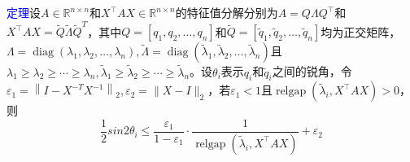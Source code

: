 \documentclass[12pt,a4paper]{article}
\begin{document}
\textcolor{blue}{定理}\quad 设$A \in \mathbb{R}^{n \times n}$和$X^{\top} A X \in \mathbb{R}^{n \times n}$的特征值分解分别为$A=Q \Lambda Q^{\top}$和$X^{\top} A X=\tilde{Q} \tilde{\Lambda} \tilde{Q}^T$，其中$Q=\left[q_{1}, q_{2}, \ldots, q_{n}\right]$和$\tilde{Q}=\left[\tilde{q}_{1}, \tilde{q}_{2}, \ldots, \tilde{q}_{n}\right]$均为正交矩阵，$\Lambda=\operatorname{diag}\left(\lambda_{1}, \lambda_{2}, \ldots, \lambda_{n}\right), \tilde{\Lambda}=\operatorname{diag}\left(\tilde{\lambda}_{1}, \tilde{\lambda}_{2}, \ldots, \tilde{\lambda}_{n}\right)$且$\lambda_{1} \geq \lambda_{2} \geq \cdots \geq \lambda_{n}, \tilde{\lambda}_{1} \geq \tilde{\lambda}_{2} \geq \cdots \geq \tilde{\lambda}_{n}$。设$\theta_{i}$表示$q_i$和$\tilde{q}_{i}$之间的锐角，令$\varepsilon_{1}=\left\|I-X^{-T} X^{-1}\right\|_{2}, \varepsilon_{2}=\|X-I\|_{2}$，若$\varepsilon_{1}<1$且$\operatorname{relgap}\left(\tilde{\lambda}_{i}, X^{\top} A X\right)>0$，则
$$
\frac{1}{2} sin2 \theta_{i} \leq \frac{\varepsilon_{1}}{1-\varepsilon_{1}} \cdot \frac{1}{\operatorname {relgap}\left(\tilde {\lambda}_{i}, X^{\top} A X\right)}+\varepsilon_{2}
$$
\end{document}

